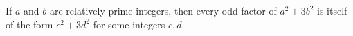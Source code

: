If $a$ and $b$ are relatively prime integers, then every odd factor of $a^2 + 3b^2$ is itself of the form $c^2 + 3d^2$ for some integers $c, d$.
